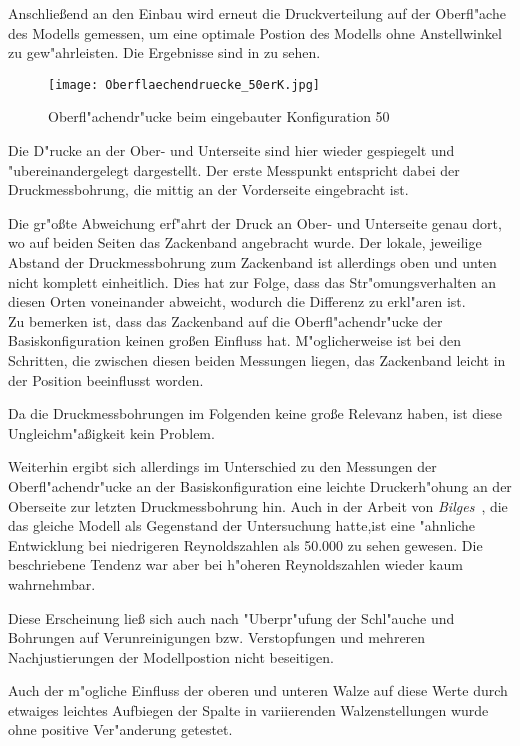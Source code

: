 Anschlie\ss{}end an den Einbau wird erneut die Druckverteilung auf der Oberfl"ache des Modells gemessen, um eine optimale Postion des Modells ohne Anstellwinkel zu gew"ahrleisten. Die Ergebnisse sind in 
zu sehen.

	\begin{figure}[h]
	\centering
	\texttt{[image: Oberflaechendruecke\_50erK.jpg]}
	\caption{Oberfl"achendr"ucke beim eingebauter Konfiguration 50}
	\label{fig:Oberflaechendruckverteilung 50}
	\end{figure}

Die D"rucke an der Ober- und Unterseite sind hier wieder gespiegelt und "ubereinandergelegt dargestellt. Der erste Messpunkt entspricht dabei der Druckmessbohrung, die mittig an der Vorderseite eingebracht ist.

Die gr"o\ss{}te Abweichung erf"ahrt der Druck an Ober- und Unterseite genau dort, wo auf beiden Seiten das Zackenband angebracht wurde. Der lokale, jeweilige Abstand der Druckmessbohrung zum Zackenband ist allerdings oben und unten nicht komplett einheitlich. Dies hat zur Folge, dass das Str"omungsverhalten an diesen Orten voneinander abweicht, wodurch die Differenz zu erkl"aren ist.\\
Zu bemerken ist, dass das Zackenband auf die Oberfl"achendr"ucke der Basiskonfiguration keinen gro\ss{}en Einfluss hat. M"oglicherweise ist bei den Schritten, die zwischen diesen beiden Messungen liegen, das Zackenband leicht in der Position beeinflusst worden.

Da die Druckmessbohrungen im Folgenden keine gro\ss{}e Relevanz haben, ist diese Ungleichm"a\ss{}igkeit kein Problem.

Weiterhin ergibt sich allerdings im Unterschied zu den Messungen der Oberfl"achendr"ucke an der Basiskonfiguration eine leichte Druckerh"ohung an der Oberseite zur letzten Druckmessbohrung hin.
Auch in der Arbeit von \emph{Bilges} \,\cite{Bilges.2018}, die das gleiche Modell als Gegenstand der Untersuchung hatte,ist eine "ahnliche Entwicklung bei niedrigeren Reynoldszahlen als 50.000 zu sehen gewesen.
Die beschriebene Tendenz war aber bei h"oheren Reynoldszahlen wieder kaum wahrnehmbar.


Diese Erscheinung lie\ss{} sich auch nach "Uberpr"ufung der Schl"auche und Bohrungen auf Verunreinigungen bzw. Verstopfungen und mehreren Nachjustierungen der Modellpostion nicht beseitigen.

Auch der m"ogliche Einfluss der oberen und unteren Walze auf diese Werte durch etwaiges leichtes Aufbiegen der Spalte in variierenden Walzenstellungen wurde ohne positive Ver"anderung getestet.

